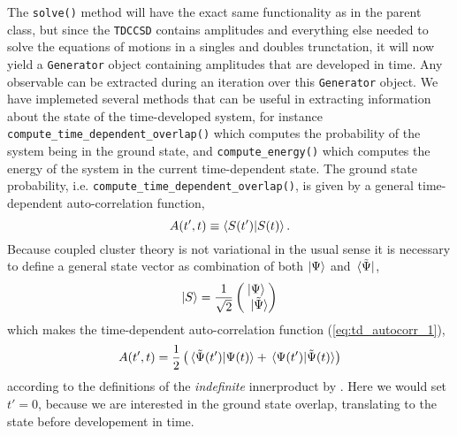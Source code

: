     The \lstinline{solve()} method will have the exact same functionality as in the parent class,
    but since the \lstinline{TDCCSD} contains amplitudes and everything else needed to 
    solve the equations of motions in a singles and doubles trunctation, it will now yield a 
    \lstinline{Generator} object 
    containing amplitudes that are developed in time. Any observable can be extracted during 
    an iteration over this \lstinline{Generator} object. We have implemeted several methods that 
    can be useful in extracting information about the state of the time-developed system,
    for instance \lstinline{compute_time_dependent_overlap()} which computes the 
    probability of the system being in the ground state, and \lstinline{compute_energy()} 
    which computes the energy of the system in the current time-dependent state.
    The ground state probability, i.e. \lstinline{compute_time_dependent_overlap()}, is 
    given by a general time-dependent auto-correlation function,
    \begin{equation}
        \label{eq:td_autocorr_1}
        A(t', t) \equiv \braket{S(t')}{S(t)}.
    \end{equation}
    Because coupled cluster theory is not variational in the usual sense it is necessary to 
    define a general state vector as combination of both $\ket{\Psi}$ and $\bra*{\tilde{\Psi}}$,
    \begin{equation}
        \ket{S} = \frac{1}{\sqrt{2}} \begin{pmatrix}
            \ket{\Psi} \\ \ket*{\tilde{\Psi}}
        \end{pmatrix}
    \end{equation}
    which makes the time-dependent auto-correlation function (\autoref{eq:td_autocorr_1}),
    \begin{equation}
        A(t', t) = \frac{1}{2} 
        \left( \braket*{\tilde{\Psi}(t')}{\Psi(t)} 
            +  \braket*{\Psi(t')}{\tilde{\Psi}(t)}  \right)
    \end{equation}
    according to the definitions of the \emph{indefinite} innerproduct by
    \citeauthor{pedersen2019symplectic}\cite{pedersen2019symplectic}. 
    Here we would set $t'=0$, because we are
    interested in the ground state overlap, translating to the state before developement 
    in time.

    

